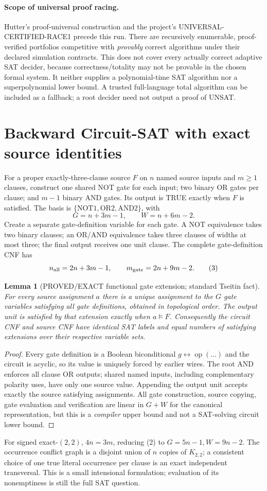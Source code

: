 \documentclass[11pt]{article}
\newtheorem{lemma}{Lemma}
\begin{document}
\paragraph{Scope of universal proof racing.}
Hutter's proof-universal construction and the project's UNIVERSAL-CERTIFIED-RACE1 precede this run. There are recursively enumerable, proof-verified portfolios competitive with \emph{provably} correct algorithms under their declared simulation contracts. This does not cover every actually correct adaptive SAT decider, because correctness/totality may not be provable in the chosen formal system. It neither supplies a polynomial-time SAT algorithm nor a superpolynomial lower bound. A trusted full-language total algorithm can be included as a fallback; a root decider need not output a proof of UNSAT.

\section{Backward Circuit-SAT with exact source identities}
For a proper exactly-three-clause source $F$ on $n$ named source inputs and $m\ge1$ clauses, construct one shared NOT gate for each input; two binary OR gates per clause; and $m-1$ binary AND gates. Its output is TRUE exactly when $F$ is satisfied. The basis is $\{\mathrm{NOT1},\mathrm{OR2},\mathrm{AND2}\}$, with
\[
G=n+3m-1,\qquad W=n+6m-2.
\tag{2}
\]
Create a separate gate-definition variable for each gate. A NOT equivalence takes two binary clauses; an OR/AND equivalence takes three clauses of widths at most three; the final output receives one unit clause. The complete gate-definition CNF has
\[
n_{\rm all}=2n+3m-1,\qquad
m_{\rm gate}=2n+9m-2.
\tag{3}
\]
\begin{lemma}[PROVED/EXACT functional gate extension; standard Tseitin fact]
For every source assignment $a$ there is a \emph{unique} assignment to the $G$ gate variables satisfying all gate definitions, obtained in topological order. The output unit is satisfied by that extension exactly when $a\models F$. Consequently the circuit CNF and source CNF have identical SAT labels and equal numbers of satisfying extensions over their respective variable sets.
\end{lemma}
\begin{proof}
Every gate definition is a Boolean biconditional $g\leftrightarrow \operatorname{op}(\ldots)$ and the circuit is acyclic, so its value is uniquely forced by earlier wires. The root AND enforces all clause OR outputs; shared named inputs, including complementary polarity uses, have only one source value. Appending the output unit accepts exactly the source satisfying assignments. All gate construction, source copying, gate evaluation and verification are linear in $G+W$ for the canonical representation, but this is a \emph{compiler} upper bound and not a SAT-solving circuit lower bound.
\end{proof}
For signed exact-$(2,2)$, $4n=3m$, reducing (2) to $G=5n-1,W=9n-2$. The occurrence conflict graph is a disjoint union of $n$ copies of $K_{2,2}$; a consistent choice of one true literal occurrence per clause is an exact independent transversal. This is a small intensional formulation; evaluation of its nonemptiness is still the full SAT question.
\end{document}

